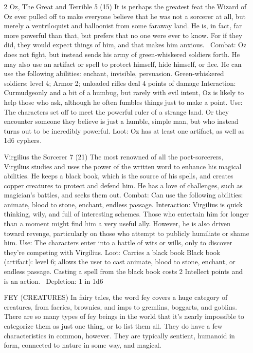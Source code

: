 \begin{multicols}{2}
Oz, The Great and Terrible 5 (15)
It is perhaps the greatest feat the Wizard of Oz ever pulled off to make everyone believe that he was not a sorcerer at all, but merely a ventriloquist and balloonist from some faraway land. He is, in fact, far more powerful than that, but prefers that no one were ever to know. For if they did, they would expect things of him, and that makes him anxious. 
Combat: Oz does not fight, but instead sends his army of green-whiskered soldiers forth.
He may also use an artifact or spell to protect himself, hide himself, or flee. He can use
the following abilities: enchant, invisible, persuasion.
	Green-whiskered soldiers: level 4; Armor 2; unloaded rifles deal 4 points of damage
Interaction: Curmudgeonly and a bit of a humbug, but rarely with evil intent, Oz is likely to
help those who ask, although he often fumbles things just to make a point.
Use: The characters set off to meet the powerful ruler of a strange land. Or they encounter
someone they believe is just a humble, simple man, but who instead turns out to be
incredibly powerful.
Loot: Oz has at least one artifact, as well as 1d6 cyphers.

Virgilius the Sorcerer 7 (21)
The most renowned of all the poet-sorcerers, Virgilius studies and uses the power of the written word to enhance his magical abilities. He keeps a black book, which is the source of his spells, and creates copper creatures to protect and defend him. He has a love of challenges, such as magician’s battles, and seeks them out.
Combat: Can use the following abilities: animate, blood to stone, enchant, endless passage. Interaction: Virgilius is quick thinking, wily, and full of interesting schemes. Those who
entertain him for longer than a moment might find him a very useful ally. However, he is also driven toward revenge, particularly on those who attempt to publicly humiliate or shame him.
Use: The characters enter into a battle of wits or wills, only to discover they’re competing with Virgilius.
Loot: Carries a black book
Black book (artifact): level 6; allows the user to cast animate, blood to stone, enchant, or endless passage. Casting a spell from the black book costs 2 Intellect points and is an action. 
Depletion: 1 in 1d6

FEY (CREATURES)
In fairy tales, the word fey covers a huge category of creatures, from faeries, brownies, and imps to gremlins, boggarts, and goblins. There are so many types of fey beings in
the world that it’s nearly impossible to categorize them as just one thing, or to list them all. They do have a few characteristics in common, however. They are typically sentient, humanoid in form, connected to nature in some way, and magical.


\end{multicols}
